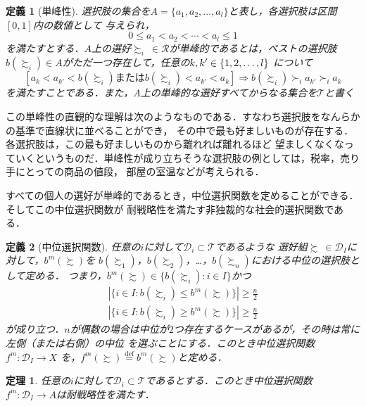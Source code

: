 \documentclass[dvipdfmx]{jsarticle}
\newtheorem*{THeorem}{定理}
\newtheorem*{DEfinition}{定義}
\begin{document}
\begin{DEfinition}[単峰性]
  選択肢の集合を$A = \{a_1, a_2, \ldots, a_{l}\}$と表し，各選択肢は区間$[0,1]$内の数値として
  与えられ，
  \[
    0 \leq a_1 < a_2 < \cdots < a_{l} \leq 1
  \]
  を満たすとする．$A$上の選好$\succsim_i \ \in \mathcal{R}$が単峰的であるとは，ベストの選択肢
  $b(\succsim_i) \in A$がただ一つ存在して，任意の$k, k' \in \{ 1, 2, \ldots, \mathnormal{l} \}$
  について
  \[
    [a_k < a_{k'} < b(\succsim_i) \text{または} b(\succsim_i) < a_{k'} < a_k]
    \Rightarrow b(\succsim_i) \succ_i a_{k'} \succ_i a_{k}
  \]
  を満たすことである．また，$A$上の単峰的な選好すべてからなる集合を$\mathcal{T}$と書く
\end{DEfinition}

この単峰性の直観的な理解は次のようなものである．すなわち選択肢をなんらかの基準で直線状に並べることができ，
その中で最も好ましいものが存在する．各選択肢は，この最も好ましいものから離れれば離れるほど
望ましくなくなっていくというものだ．単峰性が成り立ちそうな選択肢の例としては，税率，売り手にとっての商品の値段，
部屋の室温などが考えられる．

すべての個人の選好が単峰的であるとき，中位選択関数を定めることができる．そしてこの中位選択関数が
耐戦略性を満たす非独裁的な社会的選択関数である．

\begin{DEfinition}[中位選択関数]
  任意の$i$に対して$\mathcal{D}_i \subset \mathcal{T}$であるような
  選好組$\succsim \ \in \mathcal{D}_I$に対して，$b^m(\succsim)$を
  $b(\succsim_1)$，$b(\succsim_2)$，\ldots，$b(\succsim_n)$における中位の選択肢として定める．
  つまり，$b^m(\succsim) \in \{ b(\succsim_i):i \in I \}$かつ
  \begin{eqnarray*}
    | \{i \in I: b(\succsim_i) \leq b^m(\succsim) \} | \geq \frac{n}{2} \\
    | \{i \in I: b(\succsim_i) \geq b^m(\succsim) \} | \geq \frac{n}{2}
  \end{eqnarray*}
  が成り立つ．$n$が偶数の場合は中位が$2$つ存在するケースがあるが，その時は常に左側（または右側）の中位
  を選ぶことにする．このとき中位選択関数$f^m\colon \mathcal{D}_{I} \to X$
  を，$f^m(\succsim) \stackrel{\mathrm{def}}{=} b^m(\succsim)$と定める．
\end{DEfinition}

\begin{THeorem}
  任意の$i$に対して$\mathcal{D}_i \subset \mathcal{T}$であるとする．このとき中位選択関数
  $f^m\colon \mathcal{D}_I \to A$は耐戦略性を満たす．
\end{THeorem}
\end{document}
